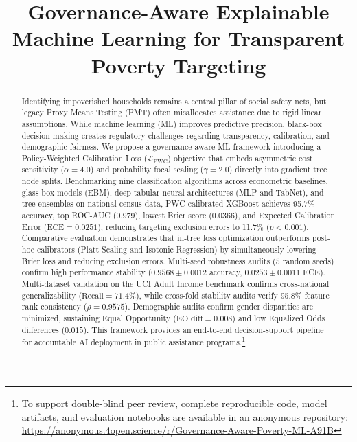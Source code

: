 \documentclass[conference]{IEEEtran}
\begin{document}
\title{Governance-Aware Explainable Machine Learning for Transparent Poverty Targeting}

\author{
}

\maketitle

\begin{abstract}
Identifying impoverished households remains a central pillar of social safety nets, but legacy Proxy Means Testing (PMT) often misallocates assistance due to rigid linear assumptions. While machine learning (ML) improves predictive precision, black-box decision-making creates regulatory challenges regarding transparency, calibration, and demographic fairness. We propose a governance-aware ML framework introducing a Policy-Weighted Calibration Loss ($\mathcal{L}_{\text{PWC}}$) objective that embeds asymmetric cost sensitivity ($\alpha=4.0$) and probability focal scaling ($\gamma=2.0$) directly into gradient tree node splits. Benchmarking nine classification algorithms across econometric baselines, glass-box models (EBM), deep tabular neural architectures (MLP and TabNet), and tree ensembles on national census data, PWC-calibrated XGBoost achieves 95.7\% accuracy, top ROC-AUC (0.979), lowest Brier score (0.0366), and Expected Calibration Error ($\text{ECE}=0.0251$), reducing targeting exclusion errors to 11.7\% ($p < 0.001$). Comparative evaluation demonstrates that in-tree loss optimization outperforms post-hoc calibrators (Platt Scaling and Isotonic Regression) by simultaneously lowering Brier loss and reducing exclusion errors. Multi-seed robustness audits ($5$ random seeds) confirm high performance stability ($0.9568 \pm 0.0012$ accuracy, $0.0253 \pm 0.0011$ ECE). Multi-dataset validation on the UCI Adult Income benchmark confirms cross-national generalizability ($\text{Recall}=71.4\%$), while cross-fold stability audits verify 95.8\% feature rank consistency ($\rho=0.9575$). Demographic audits confirm gender disparities are minimized, sustaining Equal Opportunity ($\text{EO diff}=0.008$) and low Equalized Odds differences ($0.015$). This framework provides an end-to-end decision-support pipeline for accountable AI deployment in public assistance programs.\footnote{To support double-blind peer review, complete reproducible code, model artifacts, and evaluation notebooks are available in an anonymous repository: \url{https://anonymous.4open.science/r/Governance-Aware-Poverty-ML-A91B}}
\end{abstract}
\end{document}
